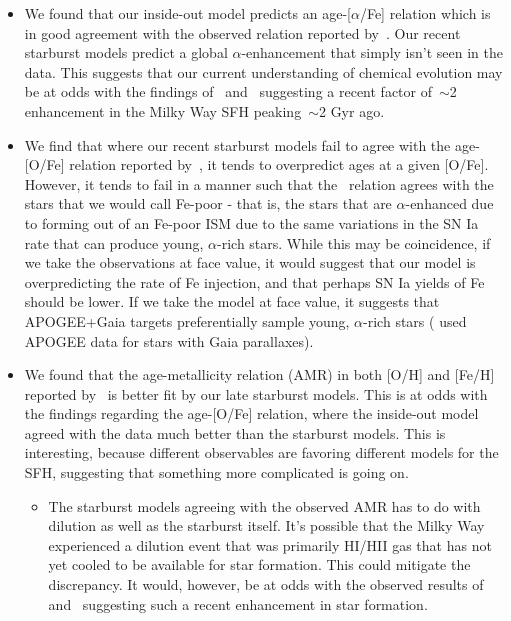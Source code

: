 \documentclass[fleqn, usenatbib]{mnras}
\begin{document}
\begin{itemize}
	\item We found that our inside-out model predicts an age-[$\alpha$/Fe] 
	relation which is in good agreement with the observed relation reported 
	by~\citet{Feuillet2019}. Our recent starburst models predict a global 
	$\alpha$-enhancement that simply isn't seen in the data. This suggests 
	that our current understanding of chemical evolution may be at odds with 
	the findings of~\citet{Mor2019} and~\citet{Isern2019} suggesting a recent 
	factor of~$\sim$2 enhancement in the Milky Way SFH peaking~$\sim$2 Gyr ago. 

	\item We find that where our recent starburst models fail to agree with 
	the age-[O/Fe] relation reported by~\citet{Feuillet2019}, it tends to 
	overpredict ages at a given [O/Fe]. However, it tends to fail in a manner 
	such that the~\citet{Feuillet2019} relation agrees with the stars that we 
	would call Fe-poor - that is, the stars that are $\alpha$-enhanced due to 
	forming out of an Fe-poor ISM due to the same variations in the SN Ia rate 
	that can produce young, $\alpha$-rich stars. While this may be coincidence, 
	if we take the observations at face value, it would suggest that our model 
	is overpredicting the rate of Fe injection, and that perhaps SN Ia yields 
	of Fe should be lower. If we take the model at face value, it suggests that 
	APOGEE+Gaia targets preferentially sample young, $\alpha$-rich stars 
	(\citealp{Feuillet2019} used APOGEE data for stars with Gaia parallaxes). 

	\item We found that the age-metallicity relation (AMR) in both [O/H] and 
	[Fe/H] reported by~\citet{Feuillet2019} is better fit by our late 
	starburst models. This is at odds with the findings regarding the 
	age-[O/Fe] relation, where the inside-out model agreed with the data much 
	better than the starburst models. This is interesting, because different 
	observables are favoring different models for the SFH, suggesting that 
	something more complicated is going on. 
	\begin{itemize} 
		\item The starburst models agreeing with the observed AMR has to do 
		with dilution as well as the starburst itself. It's possible that the 
		Milky Way experienced a dilution event that was primarily HI/HII gas 
		that has not yet cooled to be available for star formation. This could 
		mitigate the discrepancy. It would, however, be at odds with the 
		observed results of~\citet{Mor2019} and~\citet{Isern2019} suggesting 
		such a recent enhancement in star formation. 


\end{itemize}
\end{itemize}
\end{document}
